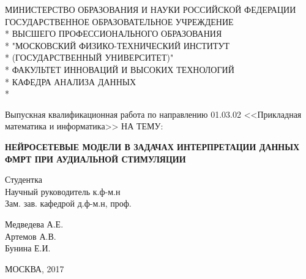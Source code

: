 \documentclass[pdftex,ptm,12pt,a4paper]{report}
\theoremstyle{definition}
\begin{document}
\begin{titlepage}
\newpage

\begin{center}
МИНИСТЕРСТВО ОБРАЗОВАНИЯ И НАУКИ РОССИЙСКОЙ ФЕДЕРАЦИИ \\
\vspace{0.5cm}
ГОСУДАРСТВЕННОЕ ОБРАЗОВАТЕЛЬНОЕ УЧРЕЖДЕНИЕ \\*
ВЫСШЕГО ПРОФЕССИОНАЛЬНОГО ОБРАЗОВАНИЯ\\*
"МОСКОВСКИЙ ФИЗИКО-ТЕХНИЧЕСКИЙ ИНСТИТУТ \\*
(ГОСУДАРСТВЕННЫЙ УНИВЕРСИТЕТ)" \\*
\vspace{0.5cm}
ФАКУЛЬТЕТ ИННОВАЦИЙ И ВЫСОКИХ ТЕХНОЛОГИЙ \\*
КАФЕДРА АНАЛИЗА ДАННЫХ \\*
\hrulefill
\end{center}


\vspace{3em}

\begin{center}
\Large Выпускная квалификационная работа по направлению 01.03.02 <<Прикладная математика и информатика>> \linebreak НА ТЕМУ:
\end{center}

\vspace{2.5em}

\begin{center}
\textsc{\large{\textbf{НЕЙРОСЕТЕВЫЕ МОДЕЛИ В ЗАДАЧАХ ИНТЕРПРЕТАЦИИ ДАННЫХ ФМРТ ПРИ АУДИАЛЬНОЙ СТИМУЛЯЦИИ}}}
\end{center}

\vspace{6.5em}

\begin{minipage}{.45\linewidth}
\begin{flushleft}                           
Студентка \\ Научный руководитель к.ф-м.н \\ Зам. зав. кафедрой д.ф-м.н, проф. 
\end{flushleft} 
\end{minipage}
\hfill
\begin{minipage}{.45\linewidth}
\begin{flushright}                                      
Медведева А.Е.\\ Артемов А.В.\\Бунина Е.И.
\end{flushright} 
\end{minipage}

\vspace{\fill}

\begin{center}
МОСКВА, 2017
\end{center}

\end{titlepage}
\end{document}
